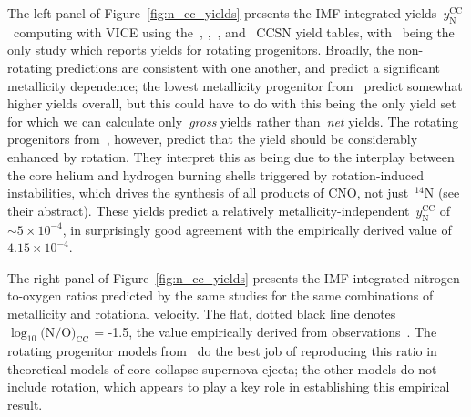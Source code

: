 \documentclass[\main/notes.tex]{subfiles}
\begin{document}
\noindent 
The left panel of Figure~\ref{fig:n_cc_yields} presents the IMF-integrated 
yields~$y_\text{N}^\text{CC}$~computing with VICE using the~\citet{Limongi2018}, 
\citet{Sukhbold2016},~\citet{Nomoto2013}, and~\citet{Woosley1995} CCSN yield 
tables, with~\citet{Limongi2018} being the only study which reports yields for 
rotating progenitors. 
Broadly, the non-rotating predictions are consistent with one another, and 
predict a significant metallicity dependence; the lowest metallicity progenitor 
from~\citet{Woosley1995} predict somewhat higher yields overall, but this could 
have to do with this being the only yield set for which we can calculate 
only~\textit{gross} yields rather than~\textit{net} yields. 
The rotating progenitors from~\citet{Limongi2018}, however, predict that the 
yield should be considerably enhanced by rotation. 
They interpret this as being due to the interplay between the core helium and 
hydrogen burning shells triggered by rotation-induced instabilities, which 
drives the synthesis of all products of CNO, not just~$^{14}$N (see their 
abstract). 
These yields predict a relatively metallicity-independent~$y_\text{N}^\text{CC}$ 
of~$\sim5\times10^{-4}$, in surprisingly good agreement with the empirically 
derived value of~$4.15\times10^{-4}$. 
\par 
The right panel of Figure~\ref{fig:n_cc_yields} presents the IMF-integrated 
nitrogen-to-oxygen ratios predicted by the same studies for the same 
combinations of metallicity and rotational velocity. 
The flat, dotted black line denotes~$\log_{10}\text{(N/O)}_\text{CC}$ = -1.5, 
the value empirically derived from observations~\citep{Vincenzo2016, 
Berg2012, Izotov2012, James2015}. 
The rotating progenitor models from~\citet{Limongi2018} do the best job of 
reproducing this ratio in theoretical models of core collapse supernova ejecta; 
the other models do not include rotation, which appears to play a key role in 
establishing this empirical result. 
\end{document}
